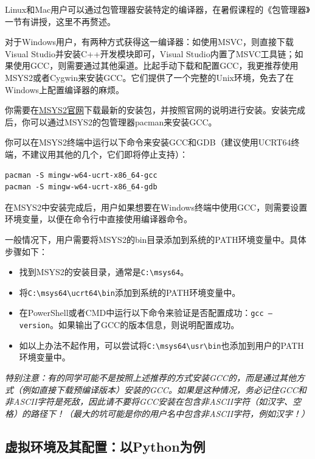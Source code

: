 \documentclass[../main.tex]{subfiles}
\begin{document}
Linux和Mac用户可以通过包管理器安装特定的编译器，在暑假课程的《包管理器》一节有讲授，这里不再赘述。

对于Windows用户，有两种方式获得这一编译器：如使用MSVC，则直接下载Visual Studio并安装C++开发模块即可，Visual Studio内置了MSVC工具链；如果使用GCC，则需要通过其他渠道。比起手动下载和配置GCC，我更推荐使用MSYS2或者Cygwin来安装GCC。它们提供了一个完整的Unix环境，免去了在Windows上配置编译器的麻烦。

你需要在\href{https://www.msys2.org/}{MSYS2官网}下载最新的安装包，并按照官网的说明进行安装。安装完成后，你可以通过MSYS2的包管理器pacman来安装GCC。

你可以在MSYS2终端中运行以下命令来安装GCC和GDB（建议使用UCRT64终端，不建议用其他的几个，它们即将停止支持）：

\begin{verbatim}
pacman -S mingw-w64-ucrt-x86_64-gcc
pacman -S mingw-w64-ucrt-x86_64-gdb
\end{verbatim}

在MSYS2中安装完成后，用户如果想要在Windows终端中使用GCC，则需要设置环境变量，以便在命令行中直接使用编译器命令。

一般情况下，用户需要将MSYS2的bin目录添加到系统的PATH环境变量中。具体步骤如下：

\begin{itemize}
  \item 找到MSYS2的安装目录，通常是\texttt{C:\textbackslash msys64}。
  \item 将\texttt{C:\textbackslash msys64\textbackslash ucrt64\textbackslash bin}添加到系统的PATH环境变量中。
  \item 在PowerShell或者CMD中运行以下命令来验证是否配置成功：\texttt{gcc --version}。如果输出了GCC的版本信息，则说明配置成功。
  \item 如以上办法不起作用，可以尝试将\texttt{C:\textbackslash msys64\textbackslash usr\textbackslash bin}也添加到用户的PATH环境变量中。
\end{itemize}

\emph{特别注意：有的同学可能不是按照上述推荐的方式安装GCC的，而是通过其他方式（例如直接下载预编译版本）安装的GCC。如果是这种情况，务必记住GCC和非ASCII字符是死敌，因此请不要将GCC安装在包含非ASCII字符（如汉字、空格）的路径下！（最大的坑可能是你的用户名中包含非ASCII字符，例如汉字！）}

\subsection{虚拟环境及其配置：以Python为例}
\end{document}
